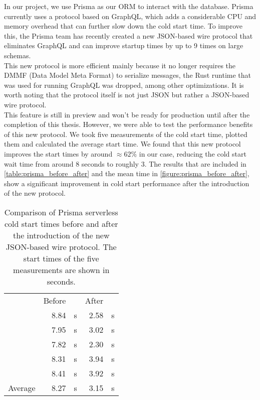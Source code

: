 \noindent
In our project, we use Prisma as our ORM to interact with the database. Prisma currently uses a protocol based on GraphQL, which adds a considerable CPU and memory overhead that can further slow down the cold start time. To improve this, the Prisma team has recently created a new JSON-based wire protocol that eliminates GraphQL and can improve startup times by up to 9 times on large schemas. \\

\noindent
This new protocol is more efficient mainly because it no longer requires the DMMF (Data Model Meta Format) to serialize messages, the Rust runtime that was used for running GraphQL was dropped, among other optimizations. It is worth noting that the protocol itself is not just JSON but rather a JSON-based wire protocol. \cite{prisma_JSON_protocol} \\

\noindent
This feature is still in preview and won't be ready for production until after the completion of this thesis. However, we were able to test the performance benefits of this new protocol. We took five measurements of the cold start time, plotted them and calculated the average start time. We found that this new protocol improves the start times by around $\approx 62\%$ in our case, reducing the cold start wait time from around 8 seconds to roughly 3. The results that are included in  \autoref{table:prisma_before_after} and the mean time in \autoref{figure:prisma_before_after}, show a significant improvement in cold start performance after the introduction of the new protocol. \\

\begin{table}[ht]
\centering
\begin{tabular}{lrlrl}
        & \multicolumn{1}{l}{Before} &   & \multicolumn{1}{l}{After} &   \\ \cline{2-5}
        & 8.84                       & s & 2.58                      & s \\
        & 7.95                       & s & 3.02                      & s \\
        & 7.82                       & s & 2.30                       & s \\
        & 8.31                       & s & 3.94                      & s \\
        & 8.41                       & s & 3.92                      & s \\ \cline{2-5} 
Average & 8.27                       & s & 3.15                      & s
\end{tabular}
\caption[Prisma serverless cold start tests]{Comparison of Prisma serverless cold start times before and after the introduction of the new JSON-based wire protocol. The start times of the five measurements are shown in seconds.}
\label{table:prisma_before_after}
\end{table}

